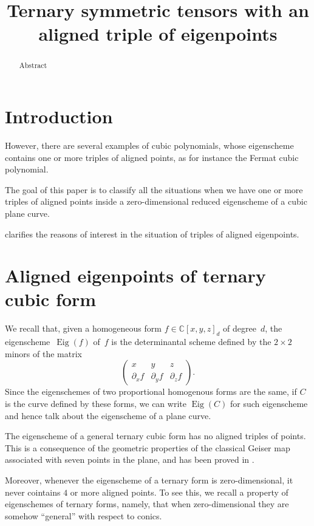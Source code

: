 \documentclass[12pt, a4paper, reqno, captions=tableheading,bibliography=totoc]{scrartcl}
\title{Ternary symmetric tensors with an aligned triple of eigenpoints}
\author{}
\date{}
\theoremstyle{plain}
\theoremstyle{definition}
\newcommand{\C}{\mathbb{C}}
\newcommand{\de}{\partial}
\newcommand{\Eig}[1]{\operatorname{Eig}\left( {#1} \right)}
\begin{document}
\maketitle

\begin{abstract}
Abstract
\end{abstract}

\section{Introduction}
\label{introduction}

However, there are several examples of cubic polynomials, whose eigenscheme contains one or more triples of aligned points, as for instance the Fermat cubic polynomial.

The goal of this paper is to classify all the situations when we have one or more triples of aligned points inside a zero-dimensional reduced eigenscheme of a cubic plane curve.

 clarifies the reasons of interest in the situation of triples of aligned eigenpoints.


\section{Aligned eigenpoints of ternary cubic form}
\label{aligned}

We recall that, given a homogeneous form $f \in \C[x,y,z]_d$ of degree~$d$, the eigenscheme~$\Eig{f}$ of~$f$ is the determinantal scheme defined by the $2 \times 2$ minors of the matrix
%
\begin{equation}
\label{eq:def_matrix}
    \begin{pmatrix}
    x & y & z \\
    \de_x f & \de_y f & \de_z f
    \end{pmatrix}.
\end{equation}
%
Since the eigenschemes of two proportional homogenous forms are the same,
if $C$ is the curve defined by these forms,
we can write $\Eig{C}$ for such eigenscheme and hence talk about the eigenscheme of a plane curve.

The eigenscheme of a general ternary cubic form has no aligned triples of points. This is a consequence of the geometric properties of the classical Geiser map associated with seven points in the plane, and has been proved in \cite[Proposition~4.5]{BGV}.

Moreover, whenever the eigenscheme of a ternary form is zero-dimensional, it never cointains $4$ or more aligned points.
To see this, we recall a property of eigenschemes of ternary forms, namely,
that when zero-dimensional they are somehow ``general'' with respect to conics.
\end{document}
